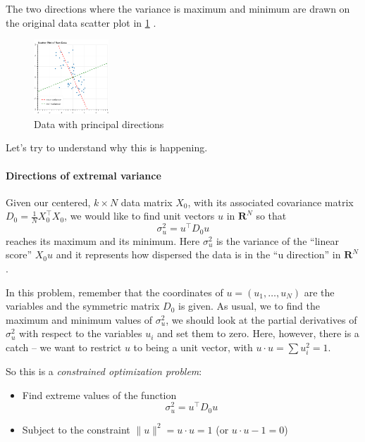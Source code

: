 \documentclass[]{article}
\providecommand{\tightlist}{%
  \setlength{\itemsep}{0pt}\setlength{\parskip}{0pt}}
\let\oldparagraph\paragraph
\renewcommand{\paragraph}[1]{\oldparagraph{#1}\mbox{}}
\begin{document}
The two directions where the variance is maximum and minimum are drawn
on the original data scatter plot in \cref{fig:pcaprincipal} .

\begin{figure}
\hypertarget{fig:pcaprincipal}{%
\centering
\includegraphics[width=0.25\textwidth,height=\textheight]{../img/PCAprincipal.png}
\caption{Data with principal directions}\label{fig:pcaprincipal}
}
\end{figure}

Let's try to understand why this is happening.

\hypertarget{directions-of-extremal-variance}{%
\paragraph{Directions of extremal
variance}\label{directions-of-extremal-variance}}

Given our centered, \(k\times N\) data matrix \(X_{0}\), with its
associated covariance matrix
\(D_{0}=\frac{1}{N}X_{0}^{\intercal}X_{0}\), we would like to find unit
vectors \(u\) in \(\mathbf{R}^{N}\) so that \[
\sigma_{u}^{2} = u^{\intercal}D_{0}u
\] reaches its maximum and its minimum. Here \(\sigma_{u}^2\) is the
variance of the ``linear score'' \(X_{0}u\) and it represents how
dispersed the data is in the ``u direction'' in \(\mathbf{R}^{N}\).

In this problem, remember that the coordinates of
\(u=(u_1,\ldots, u_{N})\) are the variables and the symmetric matrix
\(D_{0}\) is given. As usual, we to find the maximum and minimum values
of \(\sigma_{u}^{2}\), we should look at the partial derivatives of
\(\sigma_{u}^{2}\) with respect to the variables \(u_{i}\) and set them
to zero. Here, however, there is a catch -- we want to restrict \(u\) to
being a unit vector, with \(u\cdot u =\sum u_{i}^2=1\).

So this is a \emph{constrained optimization problem}:

\begin{itemize}
\tightlist
\item
  Find extreme values of the function \[
  \sigma_{u}^{2} = u^{\intercal}D_{0}u
  \]
\item
  Subject to the constraint \(\|u\|^2 = u\cdot u=1\) (or
  \(u\cdot u-1=0\))
\end{itemize}
\end{document}
